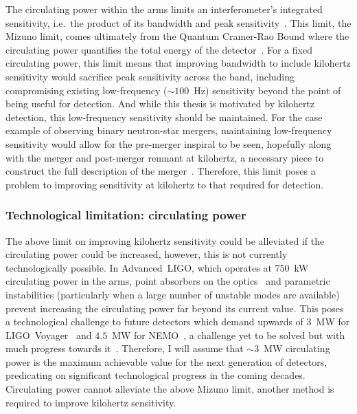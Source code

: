 The circulating power within the arms limits an interferometer's integrated sensitivity, i.e.\ the product of its bandwidth and peak sensitivity~\cite{miaoFundamentalQuantumLimit2017}.
This limit, the Mizuno limit, comes ultimately from the Quantum Cramer-Rao Bound where the circulating power quantifies the total energy of the detector~\cite{}.
For a fixed circulating power, this limit means that improving bandwidth to include kilohertz sensitivity would sacrifice peak sensitivity across the band, including compromising existing low-frequency ($\sim100$~Hz) sensitivity beyond the point of being useful for detection. %
And while this thesis is motivated by kilohertz detection, this low-frequency sensitivity should be maintained. For the case example of observing binary neutron-star mergers, maintaining low-frequency sensitivity would allow for the pre-merger inspiral to be seen, hopefully along with the merger and post-merger remnant at kilohertz, a necessary piece to construct the full description of the merger~\cite{}.
Therefore, this limit poses a problem to improving sensitivity at kilohertz to that required for detection.


\subsubsection{Technological limitation: circulating power}

The above limit on improving kilohertz sensitivity could be alleviated if the circulating power could be increased, however, this is not currently technologically possible. In Advanced~LIGO, which operates at $750$~kW circulating power in the arms, point absorbers on the optics~\cite{Brooks_2021} and parametric instabilities (particularly when a large number of unstable modes are available)~\cite{PhysRevLett.114.161102} prevent increasing the circulating power far beyond its current value. This poses a technological challenge to future detectors which demand upwards of $3$~MW for LIGO~Voyager~\cite{} and $4.5$~MW for NEMO~\cite{}, a challenge yet to be solved but with much progress towards it~\cite{}. %
Therefore, I will assume that $\sim3$~MW circulating power is the maximum achievable value for the next generation of detectors, predicating on significant technological progress in the coming decades. Circulating power cannot alleviate the above Mizuno limit, another method is required to improve kilohertz sensitivity.


